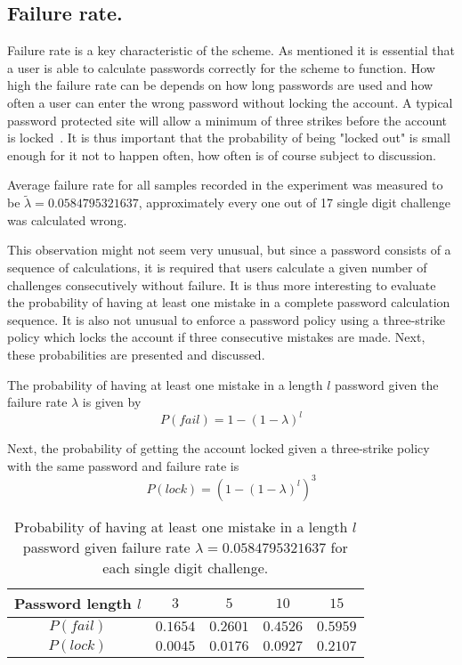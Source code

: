 \subsection{Failure rate.}
Failure rate is a key characteristic of the scheme. As mentioned it is essential that a user is able to calculate passwords correctly for the scheme to function. How high the failure rate can be depends on how long passwords are used and how often a user can enter the wrong password without locking the account. A typical password protected site will allow a minimum of three strikes before the account is locked~\cite{10-strikes}. It is thus important that the probability of being "locked out" is small enough for it not to happen often, how often is of course subject to discussion.

\begin{observation}\label{obs:failrate}
    Average failure rate for all samples recorded in the experiment was measured to be $\tilde \lambda = 0.0584795321637$, approximately every one out of 17 single digit challenge was calculated wrong.
\end{observation}
This observation might not seem very unusual, but since a password consists of a sequence of calculations, it is required that users calculate a given number of challenges consecutively without failure. It is thus more interesting to evaluate the probability of having at least one mistake in a complete password calculation sequence. It is also not unusual to enforce a password policy using a three-strike policy which locks the account if three consecutive mistakes are made. Next, these probabilities are presented and discussed. 


The probability of having at least one mistake in a length $l$ password given the failure rate $\lambda$ is given by
\begin{equation}\label{eq:failrate}
    P(fail) = 1 - (1 - \lambda)^l
\end{equation}

Next, the probability of getting the account locked given a three-strike policy with the same password and failure rate is 
\begin{equation}\label{eq:lockrate}
    P(lock) = ( 1 - (1 - \lambda)^l )^3
\end{equation}


\begin{table}[h]
    \centering
\begin{tabular}{|c|c|c|c|c|}
    \hline
    Password length $l$ & $3$ & $5$ & $10$ & $15$ \\ \hline \hline
    $P(fail)$ & $0.1654$ & $0.2601$ & $0.4526$ & $0.5959$ \\ \hline
    $P(lock)$ & $0.0045$ & $0.0176$ & $0.0927$ & $0.2107$ \\ \hline
\end{tabular}
\caption{Probability of having at least one mistake in a length $l$ password given failure rate $\lambda = 0.0584795321637$ for each single digit challenge.}
\label{tbl:failrate}
\end{table}
 
